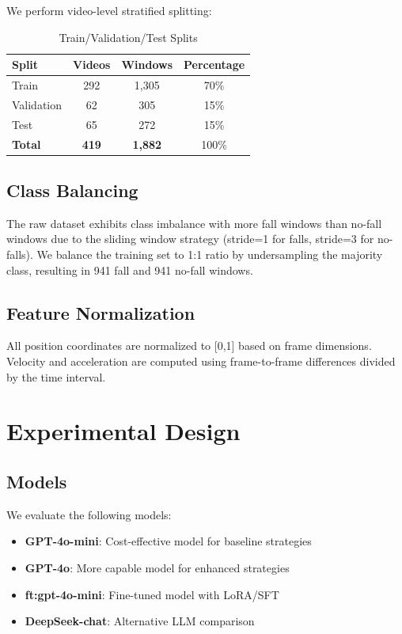 \documentclass[conference]{IEEEtran}
\begin{document}
We perform video-level stratified splitting:

\begin{table}[h]
\centering
\caption{Train/Validation/Test Splits}
\label{tab:splits}
\begin{tabular}{lccc}
\toprule
\textbf{Split} & \textbf{Videos} & \textbf{Windows} & \textbf{Percentage} \\
\midrule
Train & 292 & 1,305 & 70\% \\
Validation & 62 & 305 & 15\% \\
Test & 65 & 272 & 15\% \\
\midrule
\textbf{Total} & \textbf{419} & \textbf{1,882} & 100\% \\
\bottomrule
\end{tabular}
\end{table}

\subsection{Class Balancing}

The raw dataset exhibits class imbalance with more fall windows than no-fall windows due to the sliding window strategy (stride=1 for falls, stride=3 for no-falls). We balance the training set to 1:1 ratio by undersampling the majority class, resulting in 941 fall and 941 no-fall windows.

\subsection{Feature Normalization}

All position coordinates are normalized to [0,1] based on frame dimensions. Velocity and acceleration are computed using frame-to-frame differences divided by the time interval.

\section{Experimental Design}

\subsection{Models}

We evaluate the following models:
\begin{itemize}
    \item \textbf{GPT-4o-mini}: Cost-effective model for baseline strategies
    \item \textbf{GPT-4o}: More capable model for enhanced strategies
    \item \textbf{ft:gpt-4o-mini}: Fine-tuned model with LoRA/SFT
    \item \textbf{DeepSeek-chat}: Alternative LLM comparison
\end{itemize}
\end{document}
